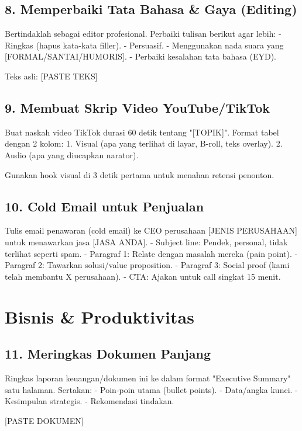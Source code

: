\subsection{8. Memperbaiki Tata Bahasa & Gaya (Editing)}
\begin{promptbox}
Bertindaklah sebagai editor profesional. Perbaiki tulisan berikut agar lebih:
- Ringkas (hapus kata-kata filler).
- Persuasif.
- Menggunakan nada suara yang [FORMAL/SANTAI/HUMORIS].
- Perbaiki kesalahan tata bahasa (EYD).

Teks asli:
[PASTE TEKS]
\end{promptbox}

\subsection{9. Membuat Skrip Video YouTube/TikTok}
\begin{promptbox}
Buat naskah video TikTok durasi 60 detik tentang "[TOPIK]".
Format tabel dengan 2 kolom:
1. Visual (apa yang terlihat di layar, B-roll, teks overlay).
2. Audio (apa yang diucapkan narator).

Gunakan hook visual di 3 detik pertama untuk menahan retensi penonton.
\end{promptbox}

\subsection{10. Cold Email untuk Penjualan}
\begin{promptbox}
Tulis email penawaran (cold email) ke CEO perusahaan [JENIS PERUSAHAAN] untuk menawarkan jasa [JASA ANDA].
- Subject line: Pendek, personal, tidak terlihat seperti spam.
- Paragraf 1: Relate dengan masalah mereka (pain point).
- Paragraf 2: Tawarkan solusi/value proposition.
- Paragraf 3: Social proof (kami telah membantu X perusahaan).
- CTA: Ajakan untuk call singkat 15 menit.
\end{promptbox}

\section{Bisnis & Produktivitas}

\subsection{11. Meringkas Dokumen Panjang}
\begin{promptbox}
Ringkas laporan keuangan/dokumen ini ke dalam format "Executive Summary" satu halaman.
Sertakan:
- Poin-poin utama (bullet points).
- Data/angka kunci.
- Kesimpulan strategis.
- Rekomendasi tindakan.

[PASTE DOKUMEN]
\end{promptbox}

